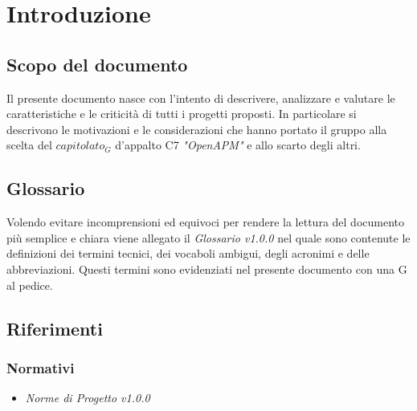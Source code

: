 \section{Introduzione}
	\subsection{Scopo del documento}
	Il presente documento nasce con l'intento di descrivere, analizzare e valutare le caratteristiche e le criticità di tutti i progetti proposti. In particolare si descrivono le motivazioni e le considerazioni che hanno portato il gruppo alla scelta del $capitolato_G$ d'appalto C7 \emph{"OpenAPM"} e allo scarto degli altri.
	\subsection{Glossario}
	Volendo evitare incomprensioni  ed equivoci per rendere la lettura del documento più semplice e chiara viene allegato il \emph{Glossario v1.0.0} nel quale sono contenute le definizioni dei termini tecnici, dei vocaboli ambigui, degli acronimi e delle abbreviazioni. Questi termini sono evidenziati nel presente documento con una G al pedice. 
	\subsection{Riferimenti}
		\subsubsection{Normativi}
		\begin{itemize}
			\item \emph{Norme di Progetto v1.0.0}
		\end{itemize}
		
